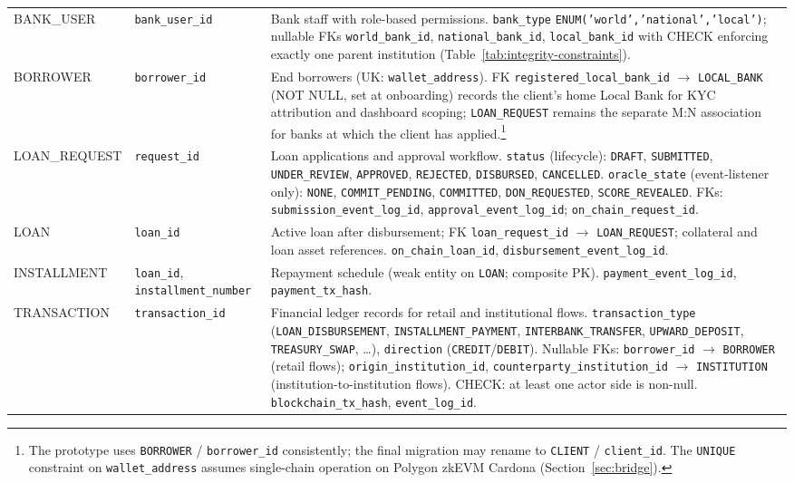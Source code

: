 \documentclass[12pt,a4paper]{report}
\begin{document}
\begin{table}[H]
\begin{tabular}{@{}p{2.6cm}p{3.4cm}p{7.0cm}@{}}
BANK\_USER & \texttt{bank\_user\_id} & Bank staff with role-based permissions. \texttt{bank\_type} \texttt{ENUM('world','national','local')}; nullable FKs \texttt{world\_bank\_id}, \texttt{national\_bank\_id}, \texttt{local\_bank\_id} with CHECK enforcing exactly one parent institution (Table~\ref{tab:integrity-constraints}). \\
BORROWER & \texttt{borrower\_id} & End borrowers (UK: \texttt{wallet\_address}). FK \texttt{registered\_local\_bank\_id} $\to$ \texttt{LOCAL\_BANK} (NOT NULL, set at onboarding) records the client's home Local Bank for KYC attribution and dashboard scoping; \texttt{LOAN\_REQUEST} remains the separate M:N association for banks at which the client has applied.\footnote{The prototype uses \texttt{BORROWER} / \texttt{borrower\_id} consistently; the final migration may rename to \texttt{CLIENT} / \texttt{client\_id}. The \texttt{UNIQUE} constraint on \texttt{wallet\_address} assumes single-chain operation on Polygon zkEVM Cardona (Section~\ref{sec:bridge}).} \\
LOAN\_REQUEST & \texttt{request\_id} & Loan applications and approval workflow. \texttt{status} (lifecycle): \texttt{DRAFT}, \texttt{SUBMITTED}, \texttt{UNDER\_REVIEW}, \texttt{APPROVED}, \texttt{REJECTED}, \texttt{DISBURSED}, \texttt{CANCELLED}. \texttt{oracle\_state} (event-listener only): \texttt{NONE}, \texttt{COMMIT\_PENDING}, \texttt{COMMITTED}, \texttt{DON\_REQUESTED}, \texttt{SCORE\_REVEALED}. FKs: \texttt{submission\_event\_log\_id}, \texttt{approval\_event\_log\_id}; \texttt{on\_chain\_request\_id}. \\
LOAN & \texttt{loan\_id} & Active loan after disbursement; FK \texttt{loan\_request\_id} $\to$ \texttt{LOAN\_REQUEST}; collateral and loan asset references. \texttt{on\_chain\_loan\_id}, \texttt{disbursement\_event\_log\_id}. \\
INSTALLMENT & \texttt{loan\_id}, \texttt{installment\_number} & Repayment schedule (weak entity on \texttt{LOAN}; composite PK). \texttt{payment\_event\_log\_id}, \texttt{payment\_tx\_hash}. \\
TRANSACTION & \texttt{transaction\_id} & Financial ledger records for retail and institutional flows. \texttt{transaction\_type} (\texttt{LOAN\_DISBURSEMENT}, \texttt{INSTALLMENT\_PAYMENT}, \texttt{INTERBANK\_TRANSFER}, \texttt{UPWARD\_DEPOSIT}, \texttt{TREASURY\_SWAP}, \ldots), \texttt{direction} (\texttt{CREDIT}/\texttt{DEBIT}). Nullable FKs: \texttt{borrower\_id} $\to$ \texttt{BORROWER} (retail flows); \texttt{origin\_institution\_id}, \texttt{counterparty\_institution\_id} $\to$ \texttt{INSTITUTION} (institution-to-institution flows). CHECK: at least one actor side is non-null. \texttt{blockchain\_tx\_hash}, \texttt{event\_log\_id}. \\

\end{tabular}
\end{table}
\end{document}
